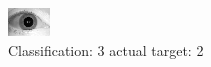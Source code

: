 \begin{figure}[h!]
\begin{center}
\includegraphics[width=0.60\columnwidth]{figures/ID1691_class_3_target_2.png}
\end{center}
\caption{ Classification: 3 actual target: 2}
\label{fig:ID1691_class_3_target_2}
\end{figure}
